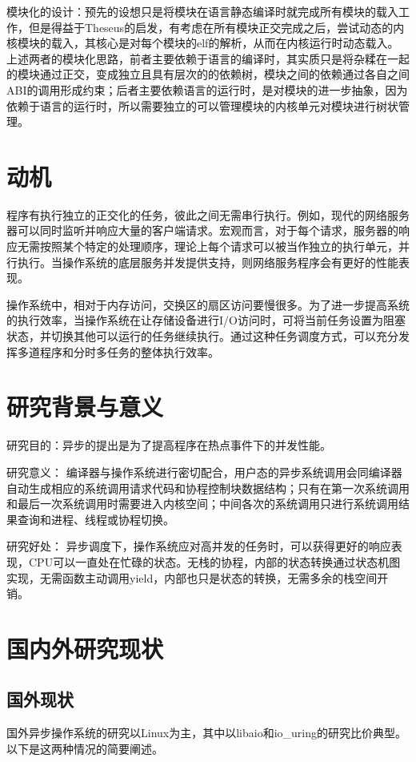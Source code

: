 模块化的设计：预先的设想只是将模块在语言静态编译时就完成所有模块的载入工作，但是得益于Theseus的启发，有考虑在所有模块正交完成之后，尝试动态的内核模块的载入，其核心是对每个模块的elf的解析，从而在内核运行时动态载入。上述两者的模块化思路，前者主要依赖于语言的编译时，其实质只是将杂糅在一起的模块通过正交，变成独立且具有层次的的依赖树，模块之间的依赖通过各自之间ABI的调用形成约束；后者主要依赖语言的运行时，是对模块的进一步抽象，因为依赖于语言的运行时，所以需要独立的可以管理模块的内核单元对模块进行树状管理。


\section{动机}

程序有执行独立的正交化的任务，彼此之间无需串行执行。例如，现代的网络服务器可以同时监听并响应大量的客户端请求。宏观而言，对于每个请求，服务器的响应无需按照某个特定的处理顺序，理论上每个请求可以被当作独立的执行单元，并行执行。当操作系统的底层服务并发提供支持，则网络服务程序会有更好的性能表现。

操作系统中，相对于内存访问，交换区的扇区访问要慢很多。为了进一步提高系统的执行效率，当操作系统在让存储设备进行I/O访问时，可将当前任务设置为阻塞状态，并切换其他可以运行的任务继续执行。通过这种任务调度方式，可以充分发挥多道程序和分时多任务的整体执行效率。


\section{研究背景与意义}

研究目的：异步的提出是为了提高程序在热点事件下的并发性能。

研究意义： 编译器与操作系统进行密切配合，用户态的异步系统调用会同编译器自动生成相应的系统调用请求代码和协程控制块数据结构；只有在第一次系统调用和最后一次系统调用时需要进入内核空间；中间各次的系统调用只进行系统调用结果查询和进程、线程或协程切换。

研究好处： 异步调度下，操作系统应对高并发的任务时，可以获得更好的响应表现，CPU可以一直处在忙碌的状态。无栈的协程，内部的状态转换通过状态机图实现，无需函数主动调用yield，内部也只是状态的转换，无需多余的栈空间开销。

\section{国内外研究现状}

\subsection{国外现状}
国外异步操作系统的研究以Linux为主，其中以libaio和io\_uring的研究比价典型。以下是这两种情况的简要阐述。

